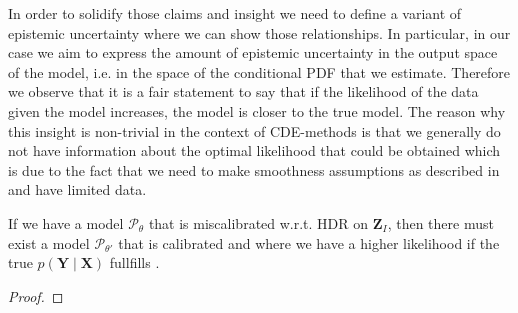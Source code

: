 In order to solidify those claims and insight we need to define a variant of epistemic uncertainty where we can show those relationships. In particular, in our case we aim to express the amount of epistemic uncertainty in the output space of the model, i.e. in the space of the conditional PDF that we estimate. Therefore we observe that it is a fair statement to say that if the likelihood of the data given the model increases, the model is closer to the true model. The reason why this insight is non-trivial in the context of CDE-methods is that we generally do not have information about the optimal likelihood that could be obtained which is due to the fact that we need to make smoothness assumptions as described in  and have limited data.

\begin{lemma}\label{lem:likelihood_increase_calibration}
    If we have a model $\mathcal{P}_{\theta}$ that is miscalibrated w.r.t. HDR on $\mathbf{Z}_I$, then there must exist a model $\mathcal{P}_{\theta'}$ that is calibrated and where we have a higher likelihood if the true $p(\mathbf{Y}\mid\mathbf{X})$ fullfills .
\end{lemma}

\begin{proof}
\end{proof}




